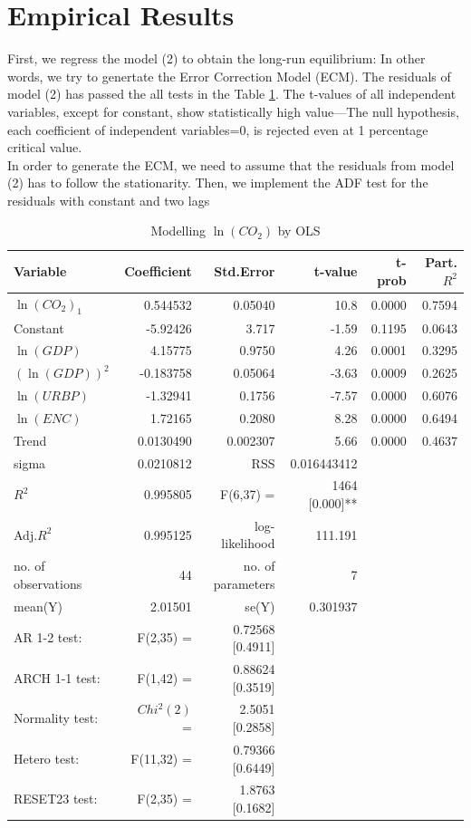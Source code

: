 \documentclass[12pt, a4paper]{article}
\begin{document}
\section{Empirical Results}
First, we regress the model (2) to obtain the long-run equilibrium: In other words, we try to genertate the Error Correction Model (ECM).  The residuals of model (2) has passed the all tests in the Table \ref{model2}.  The t-values of all independent variables, except for constant, show statistically high value---The null hypothesis, each coefficient of independent variables=0, is rejected even at 1 percentage critical value.\\
In order to generate the ECM, we need to assume that the residuals from model (2) has to follow the stationarity.  Then, we implement the ADF test for the residuals with constant and two lags

\begin{table}[h]
  \caption{Modelling $\ln{(CO_2)}$ by OLS}
  \label{model2}
  \centering
  \begin{tabular}{lrrrrr}
    \hline
   Variable    &           Coefficient & Std.Error & t-value &  t-prob  & Part.$R^2$\\
\hline\hline
$\ln{(CO_2)}_1$    &    0.544532  &  0.05040   &  10.8  & 0.0000 &  0.7594\\
Constant      &       -5.92426  &    3.717 &   -1.59 &  0.1195  &   0.0643\\
$\ln{(GDP)}$     &       4.15775   &   0.9750  &    4.26  &  0.0001  &   0.3295\\
$(\ln{(GDP)})^2$   &   -0.183758  &  0.05064  &   -3.63  &  0.0009  &   0.2625\\
$\ln{(URBP)} $  &       -1.32941 &    0.1756 &    -7.57 &  0.0000  &  0.6076\\
$\ln{(ENC)} $     &      1.72165  &   0.2080   &   8.28  & 0.0000  &  0.6494\\
Trend       &        0.0130490 &   0.002307  &   5.66 &  0.0000  &   0.4637\\
\hline
sigma     &          0.0210812 &   RSS           &  0.016443412 &\\
$R^2$       &           0.995805 &  F(6,37) =   & 1464 [0.000]** &\\
Adj.$R^2$   &           0.995125  & log-likelihood   &     111.191 & \\
no. of observations    &    44 &  no. of parameters    &       7 & \\
mean(Y)      &         2.01501 & se(Y)      &        0.301937 & \\
\hline
AR 1-2 test:   &   F(2,35)   = & 0.72568 [0.4911]    & \\
ARCH 1-1 test: &   F(1,42)   = & 0.88624 [0.3519]  &\\
Normality test:  & $Chi^2(2)$  =  & 2.5051 [0.2858]  & \\
Hetero test:     & F(11,32)  = &  0.79366 [0.6449]  & \\
RESET23 test:   &  F(2,35)   = &  1.8763 [0.1682]  & \\
    \hline
  \end{tabular}
\end{table}
\end{document}

